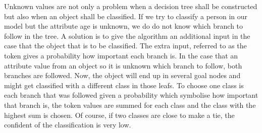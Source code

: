 \documentclass{article}
\begin{document}
Unknown values are not only a problem when a decision tree shall be constructed but also when an object shall be classified. If we try to classify a person in our model but the attribute age is unknown, we do do not know which branch to follow in the tree. A solution is to give the algorithm an additional input in the case that the object that is to be classified. The extra input, referred to as the token gives a probability how important each branch is. In the case that an attribute value from an object so it is unknown which branch to follow, both branches are followed. Now, the object will end up in several goal nodes and might get classified with a different class in those leafs. To choose one class is each branch that was followed given a probability which symbolise how important that branch is, the token values are summed for each class and the class with the highest sum is chosen. Of course, if two classes are close to make a tie, the confident of the classification is very low.


\end{document}
